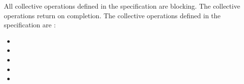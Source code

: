All collective operations defined in the specification are blocking. The 
collective operations return on completion.
The collective operations defined in the \openshmem{} specification 
are :

\begin{itemize}
\item[] \broadcast{} 
\item[] \barrier{}
\item[] \barrierall{}
\item[] \collect{}
\item[] \reduction{} %
\end{itemize} 
